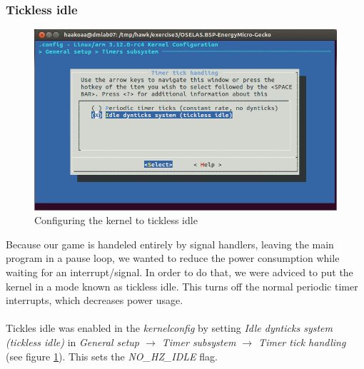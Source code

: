 \subsubsection{Tickless idle}
\begin{figure}[h]
	\centering
	\includegraphics[width=12cm]{img/tickless.png}
	\caption{Configuring the kernel to tickless idle}
	\label{fig:tickless}
\end{figure}
Because our game is handeled entirely by signal handlers, leaving the main program in a pause loop, we wanted to reduce the power consumption while waiting for an interrupt/signal. In order to do that, we were adviced to put the kernel in a mode known as tickless idle. This turns off the normal periodic timer interrupts, which decreases power usage.\\
\\
Tickles idle was enabled in the \emph{kernelconfig} by setting \emph{Idle dynticks system (tickless idle)} in \emph{General setup $\rightarrow$ Timer subsystem $\rightarrow$ Timer tick handling} (see figure \ref{fig:tickless}). This sets the \emph{NO\_HZ\_IDLE} flag.
